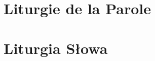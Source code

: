 \newpage
\section[Liturgie de la Parole]{Liturgie de la Parole}
\begin{french}







\end{french}

\newpage
\section[Liturgia Słowa]{Liturgia Słowa}
\begin{polish}







\end{polish}

